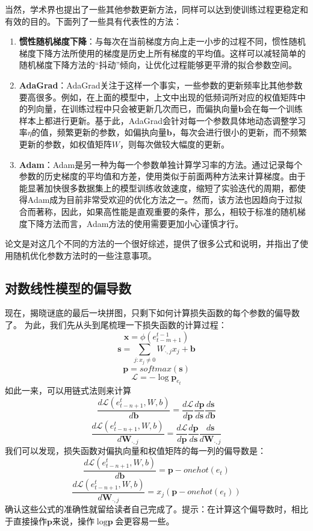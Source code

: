 \documentclass[10pt,a4paper]{ctexart}
\begin{document}
当然，学术界也提出了一些其他参数更新方法，同样可以达到使训练过程更稳定和有效的目的。下面列了一些具有代表性的方法：
\begin{enumerate}
\item[] \textbf{惯性随机梯度下降\cite{holyoak1987parallel}}：与每次在当前梯度方向上走一小步的过程不同，惯性随机梯度下降方法所使用的梯度是历史上所有梯度的平均值。这样可以减轻简单的随机梯度下降方法的“抖动”倾向，让优化过程能够更平滑的拟合参数空间。
\item[] \textbf{AdaGrad\cite{duchi2011adaptive}}：AdaGrad关注于这样一个事实，一些参数的更新频率比其他参数要高很多。例如，在上面的模型中，上文中出现的低频词所对应的权值矩阵中的列向量，在训练过程中只会被更新几次而已，而偏执向量$\textbf{b}$会在每一个训练样本上都进行更新。基于此，AdaGrad会针对每一个参数具体地动态调整学习率$\eta$的值，频繁更新的参数，如偏执向量$\textbf{b}$，每次会进行很小的更新，而不频繁更新的参数，如权值矩阵$W$，则每次做较大幅度的更新。
\item[] \textbf{Adam\cite{kingma2014adam}}：Adam是另一种为每一个参数单独计算学习率的方法。通过记录每个参数的历史梯度的平均值和方差，使用类似于前面两种方法来计算梯度。由于能显著加快很多数据集上的模型训练收敛速度，缩短了实验迭代的周期，都使得Adam成为目前非常受欢迎的优化方法之一。然而，该方法也因趋向于过拟合而著称，因此，如果高性能是直观重要的条件，那么，相较于标准的随机梯度下降方法而言，Adam方法的使用需要更加小心谨慎才行。
\end{enumerate}
论文\cite{ruder2016overview}是对这几个不同的方法的一个很好综述，提供了很多公式和说明，并指出了使用随机优化参数方法时的一些注意事项。

\subsection{对数线性模型的偏导数}
现在，揭晓谜底的最后一块拼图，只剩下如何计算损失函数的每个参数的偏导数了。
为此，我们先从头到尾梳理一下损失函数的计算过程：
\[
 \textbf{x} = \phi (e_{t-m+1}^{t-1})
\]
\[
  \textbf{s} = \sum_{j:x_j \neq 0} W_{\cdot,j}x_j + \textbf{b}
\]
\[
 \textbf{p} = softmax(\textbf{s})
\]
\[
 \mathcal{L} = - \log \textbf{p}_{e_t}
\]
如此一来，可以用链式法则来计算
\[
 \frac{d\mathcal{L}(e_{t-n+1}^t,W,b)}{d\textbf{b}} = \frac{d\mathcal{L}}{d\textbf{p}}\frac{d\textbf{p}}{d\textbf{s}}\frac{d\textbf{s}}{d\textbf{b}}
\]
\[
 \frac{d\mathcal{L}(e_{t-n+1}^t,W,b)}{d\textbf{W}_{\cdot,j}} = \frac{d\mathcal{L}}{d\textbf{p}}\frac{d\textbf{p}}{d\textbf{s}}\frac{d\textbf{s}}{d\textbf{W}_{\cdot,j}}
\]
我们可以发现，损失函数对偏执向量和权值矩阵的每一列的偏导数是：
\[
 \frac{d\mathcal{L}(e_{t-n+1}^t,W,b)}{d\textbf{b}} = \textbf{p} - onehot(e_t)
\]
\[
 \frac{d\mathcal{L}(e_{t-n+1}^t,W,b)}{d\textbf{W}_{\cdot,j}} = x_j (\textbf{p} - onehot(e_t))
\]
确认这些公式的准确性就留给读者自己完成了。提示：在计算这个偏导数时，相比于直接操作$\textbf{p}$来说，操作$\log \textbf{p}$会更容易一些。
\end{document}
